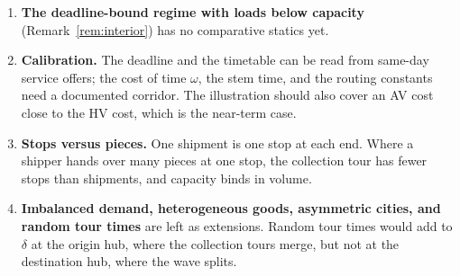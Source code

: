\documentclass[10pt, reqno]{amsart}
\theoremstyle{definition}
\begin{document}
\begin{enumerate}
\item \textbf{The deadline-bound regime with loads below capacity} (Remark~\ref{rem:interior}) has no comparative statics yet.
\item \textbf{Calibration.} The deadline and the timetable can be read from same-day service offers; the cost of time $\omega$, the stem time, and the routing constants need a documented corridor. The illustration should also cover an AV cost close to the HV cost, which is the near-term case.
\item \textbf{Stops versus pieces.} One shipment is one stop at each end. Where a shipper hands over many pieces at one stop, the collection tour has fewer stops than shipments, and capacity binds in volume.
\item \textbf{Imbalanced demand, heterogeneous goods, asymmetric cities, and random tour times} are left as extensions. Random tour times would add to $\delta$ at the origin hub, where the collection tours merge, but not at the destination hub, where the wave splits.
\end{enumerate}
\end{document}
